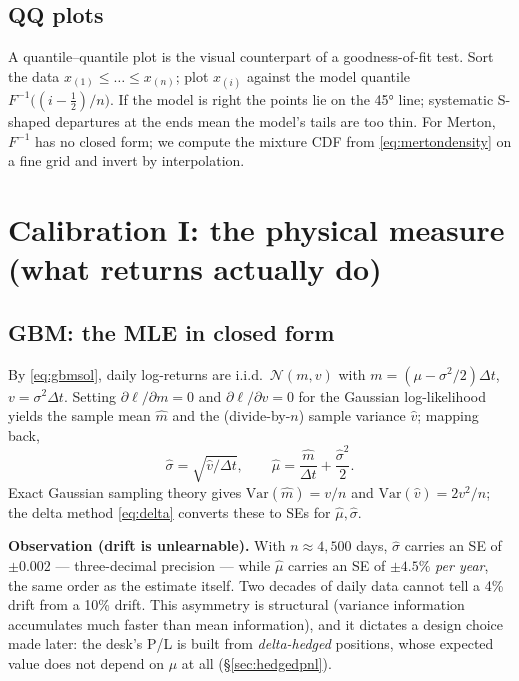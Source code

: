 \documentclass[11pt,a4paper]{article}
\newcommand{\Var}{\mathrm{Var}}
\newcommand{\N}{\mathcal{N}}
\begin{document}
\subsection{QQ plots}
A quantile--quantile plot is the visual counterpart of a goodness-of-fit test.
Sort the data $x_{(1)}\le\dots\le x_{(n)}$; plot $x_{(i)}$ against the model
quantile $F^{-1}\big((i-\tfrac12)/n\big)$. If the model is right the points lie
on the 45° line; systematic S-shaped departures at the ends mean the model's
tails are too thin. For Merton, $F^{-1}$ has no closed form; we compute the
mixture CDF from \eqref{eq:mertondensity} on a fine grid and invert by
interpolation.

\section{Calibration I: the physical measure (what returns actually do)}
\label{sec:physical}

\subsection{GBM: the MLE in closed form}
By \eqref{eq:gbmsol}, daily log-returns are i.i.d.\
$\N(m,v)$ with $m=(\mu-\sigma^2/2)\Delta t$, $v=\sigma^2\Delta t$. Setting
$\partial\ell/\partial m=0$ and $\partial\ell/\partial v=0$ for the Gaussian
log-likelihood yields the sample mean $\hat m$ and the (divide-by-$n$) sample
variance $\hat v$; mapping back,
\begin{equation}
\hat\sigma=\sqrt{\hat v/\Delta t},\qquad
\hat\mu=\frac{\hat m}{\Delta t}+\frac{\hat\sigma^2}{2}.
\end{equation}
Exact Gaussian sampling theory gives $\Var(\hat m)=v/n$ and
$\Var(\hat v)=2v^2/n$; the delta method \eqref{eq:delta} converts these to SEs
for $\hat\mu,\hat\sigma$.

\begin{obsbox}
\textbf{Observation (drift is unlearnable).} With $n\approx4{,}500$ days,
$\hat\sigma$ carries an SE of $\pm0.002$ --- three-decimal precision --- while
$\hat\mu$ carries an SE of $\pm4.5\%$ \emph{per year}, the same order as the
estimate itself. Two decades of daily data cannot tell a 4\% drift from a 10\%
drift. This asymmetry is structural (variance information accumulates much
faster than mean information), and it dictates a design choice made later: the
desk's P/L is built from \emph{delta-hedged} positions, whose expected value
does not depend on $\mu$ at all (\S\ref{sec:hedgedpnl}).
\end{obsbox}
\end{document}
